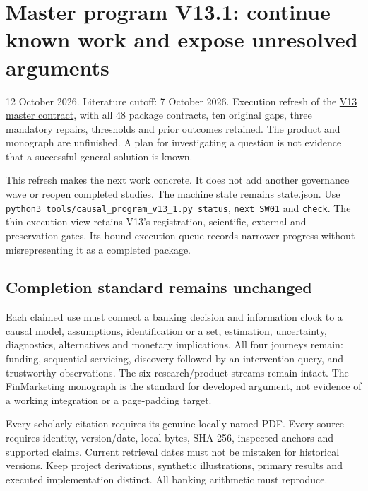 \documentclass[
  10pt,
]{article}
\author{}
\date{}
\begin{document}
\hypertarget{master-program-v131-continue-known-work-and-expose-unresolved-arguments}{%
\section{Master program V13.1: continue known work and expose unresolved
arguments}\label{master-program-v131-continue-known-work-and-expose-unresolved-arguments}}

12 October 2026. Literature cutoff: 7 October 2026. Execution refresh of
the \href{master-program-v13.md}{V13 master contract}, with all 48
package contracts, ten original gaps, three mandatory repairs,
thresholds and prior outcomes retained. The product and monograph are
unfinished. A plan for investigating a question is not evidence that a
successful general solution is known.

This refresh makes the next work concrete. It does not add another
governance wave or reopen completed studies. The machine state remains
\url{state.json}. Use
\texttt{python3\ tools/causal\_program\_v13\_1.py\ status},
\texttt{next\ SW01} and \texttt{check}. The thin execution view retains
V13's registration, scientific, external and preservation gates. Its
bound execution queue records narrower progress without misrepresenting
it as a completed package.

\hypertarget{completion-standard-remains-unchanged}{%
\subsection{Completion standard remains
unchanged}\label{completion-standard-remains-unchanged}}

Each claimed use must connect a banking decision and information clock
to a causal model, assumptions, identification or a set, estimation,
uncertainty, diagnostics, alternatives and monetary implications. All
four journeys remain: funding, sequential servicing, discovery followed
by an intervention query, and trustworthy observations. The six
research/product streams remain intact. The FinMarketing monograph is
the standard for developed argument, not evidence of a working
integration or a page-padding target.

Every scholarly citation requires its genuine locally named PDF. Every
source requires identity, version/date, local bytes, SHA-256, inspected
anchors and supported claims. Current retrieval dates must not be
mistaken for historical versions. Keep project derivations, synthetic
illustrations, primary results and executed implementation distinct. All
banking arithmetic must reproduce.
\end{document}
